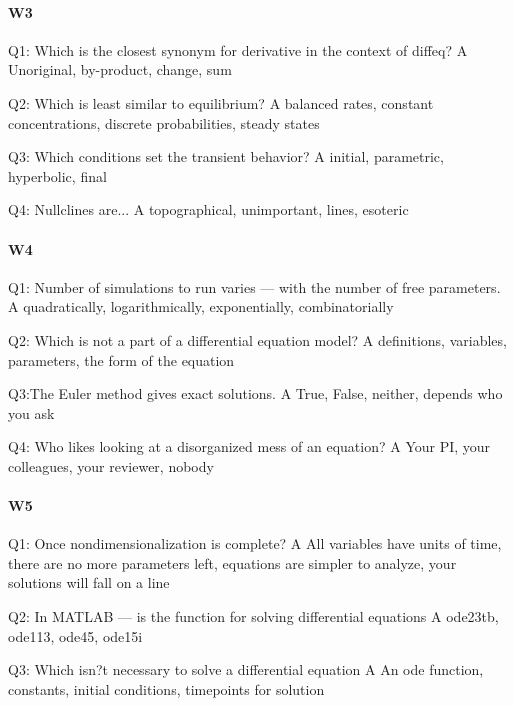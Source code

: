 \paragraph{W3}
Q1: Which is the closest synonym for derivative in the context of diffeq?
A Unoriginal, by-product, change, sum

Q2: Which is least similar to equilibrium?
A balanced rates, constant concentrations, discrete probabilities, steady states

Q3: Which conditions set the transient behavior?
A initial, parametric, hyperbolic, final

Q4: Nullclines are...
A topographical, unimportant, lines, esoteric

\paragraph{W4}
Q1: Number of simulations to run varies --- with the number of free parameters.
A quadratically, logarithmically, exponentially, combinatorially

Q2: Which is not a part of a differential equation model?
A definitions, variables, parameters, the form of the equation

Q3:The Euler method gives exact solutions.
A True, False, neither, depends who you ask

Q4: Who likes looking at a disorganized mess of an equation?
A Your PI, your colleagues, your reviewer, nobody

\paragraph{W5}
Q1: Once nondimensionalization is complete?
A All variables have units of time, there are no more parameters left, equations are simpler to analyze, your solutions will fall on a line

Q2: In MATLAB --- is the function for solving differential equations
A ode23tb, ode113, ode45, ode15i

Q3: Which isn?t necessary to solve a differential equation
A An ode function, constants, initial conditions, timepoints for solution

